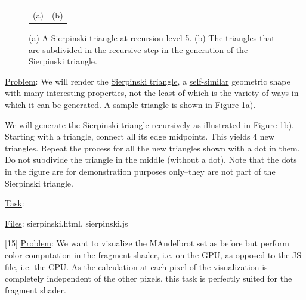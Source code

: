 \documentclass[addpoints]{exam}
\begin{document}
\begin{questions}
\begin{figure}
\begin{tabular}{cc}
\begin{tikzpicture}
        \node at (3,-1) {};
      \end{tikzpicture}\\
      (a) & (b)
    \end{tabular}
    \caption{(a) A Sierpinski triangle at recursion level 5. (b) The triangles that are subdivided in the recursive step in the generation of the Sierpinski triangle.}
    \label{fig:sierpinski}
  \end{figure}
  
\underline{Problem}: We will render the \href{https://en.wikipedia.org/wiki/Sierpinski_triangle}{Sierpinski triangle}, a \href{https://en.wikipedia.org/wiki/Self-similarity}{self-similar} geometric shape with many interesting properties, not the least of which is the variety of ways in which it can be generated. A sample triangle is shown in Figure \ref{fig:sierpinski}a).

We will generate the Sierpinski triangle recursively as illustrated in Figure \ref{fig:sierpinski}b). Starting with a triangle, connect all its edge midpoints. This yields 4 new triangles. Repeat the process for all the new triangles shown with a dot in them. Do not subdivide the triangle in the middle (without a dot). Note that the dots in the figure are for demonstration purposes only--they are not part of the Sierpinski triangle.

\underline{Task}:
  \underline{Files}: sierpinski.html, sierpinski.js


  
[15]
  \underline{Problem}: We want to visualize the MAndelbrot set as before but perform color computation in the fragment shader, i.e. on the GPU, as opposed to the JS file, i.e. the CPU. As the calculation at each pixel of the visualization is completely independent of the other pixels, this task is perfectly suited for the fragment shader.


\end{questions}
\end{document}
